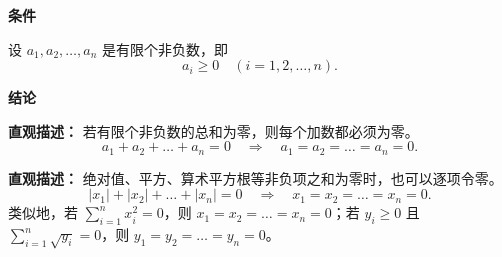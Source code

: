 \begin{statementbox}
	\textbf{\textcolor{CStatement}{条件}}
	\begin{description}[style=nextline, leftmargin=2.8em, labelsep=0.5em, itemsep=0.35em]
		\item[\textbf{\textcolor{CStatement}{条件 1（非负项有限）：}}]
		      设 $a_1,a_2,\dots,a_n$ 是有限个非负数，即
		      \[
			      a_i\ge 0\quad (i=1,2,\dots,n).
		      \]
	\end{description}

	\textbf{\textcolor{CStatement}{结论}}
	\begin{description}[style=nextline, leftmargin=2.8em, labelsep=0.5em, itemsep=0.45em]
		\item[\textbf{\textcolor{CStatement}{结论一（每项必为零）：}}]
		      \textbf{\textcolor{CStatement}{直观描述：}} 若有限个非负数的总和为零，则每个加数都必须为零。
		      \[
			      a_1+a_2+\dots+a_n=0
			      \quad\Rightarrow\quad
			      a_1=a_2=\dots=a_n=0.
		      \]

		\item[\textbf{\textcolor{CStatement}{推广结论（常见非负形式）：}}]
		      \textbf{\textcolor{CStatement}{直观描述：}} 绝对值、平方、算术平方根等非负项之和为零时，也可以逐项令零。
		      \[
			      |x_1|+|x_2|+\dots+|x_n|=0
			      \quad\Rightarrow\quad
			      x_1=x_2=\dots=x_n=0.
		      \]
		      类似地，若 $\sum_{i=1}^n x_i^2=0$，则 $x_1=x_2=\dots=x_n=0$；若 $y_i\ge0$ 且 $\sum_{i=1}^n \sqrt{y_i}=0$，则 $y_1=y_2=\dots=y_n=0$。
	\end{description}
\end{statementbox}